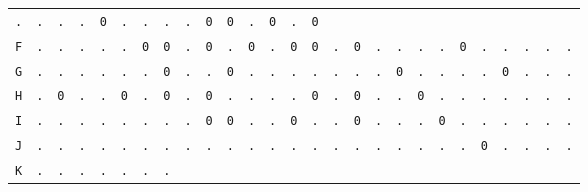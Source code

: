 \begin{figure}[H]
\begin{center}
{\begin{tabular}{c|cccccccccccccccccccccccccc}
				\texttt{.} & \texttt{.} & \texttt{.} & \texttt{.} &
				\texttt{0} & \texttt{.} & \texttt{.} & \texttt{.} &
				\texttt{.} & \texttt{0} & \texttt{0} & \texttt{.} &
				\texttt{0} & \texttt{.} & \texttt{0}                             \\
				\texttt{F} & \texttt{.} & \texttt{.} & \texttt{.} &
				\texttt{.} & \texttt{.} & \texttt{0} & \texttt{0} &
				\texttt{.} & \texttt{0} & \texttt{.} & \texttt{0} &
				\texttt{.} & \texttt{0} & \texttt{0} & \texttt{.} &
				\texttt{0} & \texttt{.} & \texttt{.} & \texttt{.} &
				\texttt{.} & \texttt{0} & \texttt{.} & \texttt{.} &
				\texttt{.} & \texttt{.} & \texttt{.}                             \\
				\texttt{G} & \texttt{.} & \texttt{.} & \texttt{.} &
				\texttt{.} & \texttt{.} & \texttt{.} & \texttt{0} &
				\texttt{.} & \texttt{.} & \texttt{0} & \texttt{.} &
				\texttt{.} & \texttt{.} & \texttt{.} & \texttt{.} &
				\texttt{.} & \texttt{.} & \texttt{0} & \texttt{.} &
				\texttt{.} & \texttt{.} & \texttt{.} & \texttt{0} &
				\texttt{.} & \texttt{.} & \texttt{.}                             \\
				\texttt{H} & \texttt{.} & \texttt{0} & \texttt{.} &
				\texttt{.} & \texttt{0} & \texttt{.} & \texttt{0} &
				\texttt{.} & \texttt{0} & \texttt{.} & \texttt{.} &
				\texttt{.} & \texttt{.} & \texttt{0} & \texttt{.} &
				\texttt{0} & \texttt{.} & \texttt{.} & \texttt{0} &
				\texttt{.} & \texttt{.} & \texttt{.} & \texttt{.} &
				\texttt{.} & \texttt{.} & \texttt{.}                             \\
				\texttt{I} & \texttt{.} & \texttt{.} & \texttt{.} &
				\texttt{.} & \texttt{.} & \texttt{.} & \texttt{.} &
				\texttt{.} & \texttt{0} & \texttt{0} & \texttt{.} &
				\texttt{.} & \texttt{0} & \texttt{.} & \texttt{.} &
				\texttt{0} & \texttt{.} & \texttt{.} & \texttt{.} &
				\texttt{0} & \texttt{.} & \texttt{.} & \texttt{.} &
				\texttt{.} & \texttt{.} & \texttt{.}                             \\
				\texttt{J} & \texttt{.} & \texttt{.} & \texttt{.} &
				\texttt{.} & \texttt{.} & \texttt{.} & \texttt{.} &
				\texttt{.} & \texttt{.} & \texttt{.} & \texttt{.} &
				\texttt{.} & \texttt{.} & \texttt{.} & \texttt{.} &
				\texttt{.} & \texttt{.} & \texttt{.} & \texttt{.} &
				\texttt{.} & \texttt{.} & \texttt{0} & \texttt{.} &
				\texttt{.} & \texttt{.} & \texttt{.}                             \\
				\texttt{K} & \texttt{.} & \texttt{.} & \texttt{.} &
				\texttt{.} & \texttt{.} & \texttt{.} & \texttt{.} &

\end{tabular}}
\end{center}
\end{figure}
